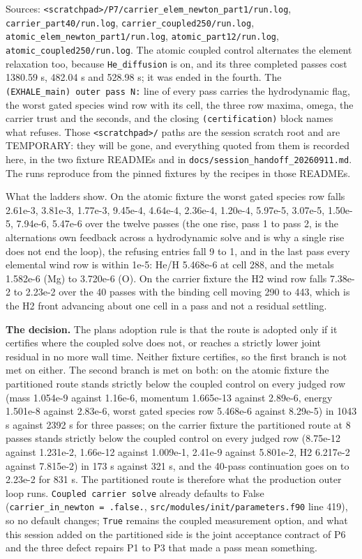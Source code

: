 \documentclass[english,a4paper]{my_memo}
\begin{document}
Sources: \texttt{\textless{}scratchpad\textgreater{}/P7/carrier\_elem\_newton\_part1/run.log},
\texttt{carrier\_part40/run.log}, \texttt{carrier\_coupled250/run.log},
\texttt{atomic\_elem\_newton\_part1/run.log}, \texttt{atomic\_part12/run.log},
\texttt{atomic\_coupled250/run.log}. The atomic coupled control alternates the
element relaxation too, because \texttt{He\_diffusion} is on, and its three completed
passes cost 1380.59 s, 482.04 s and 528.98 s; it was ended in the fourth. The
\texttt{(EXHALE\_main)\ outer\ pass\ N:} line of every pass carries the hydrodynamic
flag, the worst gated species wind row with its cell, the three row maxima,
omega, the carrier trust and the seconds, and the closing \texttt{(certification)}
block names what refuses. Those \texttt{\textless{}scratchpad\textgreater{}/} paths are the session scratch
root and are TEMPORARY: they will be gone, and everything quoted from them is
recorded here, in the two fixture READMEs and in
\texttt{docs/session\_handoff\_20260911.md}. The runs reproduce from the pinned
fixtures by the recipes in those READMEs.

What the ladders show. On the atomic fixture the worst gated species row
falls 2.61e-3, 3.81e-3, 1.77e-3, 9.45e-4, 4.64e-4, 2.36e-4, 1.20e-4,
5.97e-5, 3.07e-5, 1.50e-5, 7.94e-6, 5.47e-6 over the twelve passes (the one
rise, pass 1 to pass 2, is the alternation\textquotesingle s own feedback across a
hydrodynamic solve and is why a single rise does not end the loop), the
refusing entries fall 9 to 1, and in the last pass every elemental wind row
is within 1e-5: He/H 5.468e-6 at cell 288, and the metals 1.582e-6 (Mg) to
3.720e-6 (O). On the carrier fixture the H2 wind row falls 7.38e-2 to
2.23e-2 over the 40 passes with the binding cell moving 290 to 443, which is
the H2 front advancing about one cell in a pass and not a residual settling.

\textbf{The decision.} The plan\textquotesingle s adoption rule is that the route is adopted only
if it certifies where the coupled solve does not, or reaches a strictly lower
joint residual in no more wall time. Neither fixture certifies, so the first
branch is not met on either. The second branch is met on both: on the atomic
fixture the partitioned route stands strictly below the coupled control on
every judged row (mass 1.054e-9 against 1.16e-6, momentum 1.665e-13 against
2.89e-6, energy 1.501e-8 against 2.83e-6, worst gated species row 5.468e-6
against 8.29e-5) in 1043 s against 2392 s for three passes; on the carrier
fixture the partitioned route at 8 passes stands strictly below the coupled
control on every judged row (8.75e-12 against 1.231e-2, 1.66e-12 against
1.009e-1, 2.41e-9 against 5.801e-2, H2 6.217e-2 against 7.815e-2) in 173 s
against 321 s, and the 40-pass continuation goes on to 2.23e-2 for 831 s.
The partitioned route is therefore what the production outer loop runs.
\texttt{Coupled\ carrier\ solve} already defaults to False
(\texttt{carrier\_in\_newton\ =\ .false.}, \texttt{src/modules/init/parameters.f90} line 419),
so no default changes; \texttt{True} remains the coupled measurement option, and what
this session added on the partitioned side is the joint acceptance contract
of P6 and the three defect repairs P1 to P3 that made a pass mean something.
\end{document}
